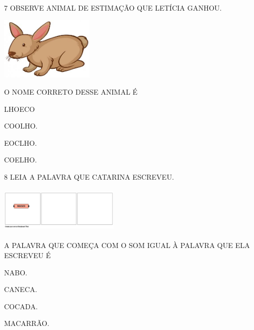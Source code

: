 
\num{7} OBSERVE ANIMAL DE ESTIMAÇÃO QUE LETÍCIA GANHOU.

\includegraphics[width=1.75903in,height=1.18611in]{media/image246.jpg}

O NOME CORRETO DESSE ANIMAL É

\begin{escolha}
\item LHOECO

\item COOLHO.

\item EOCLHO.

\item COELHO.
\end{escolha}


\num{8} LEIA A PALAVRA QUE CATARINA ESCREVEU.

\includegraphics[width=2.25361in,height=0.86599in]{media/image247.png}

A PALAVRA QUE COMEÇA COM O SOM IGUAL À PALAVRA QUE ELA ESCREVEU É 

\begin{escolha}
\item NABO.

\item CANECA.

\item COCADA.

\item MACARRÃO.
\end{escolha}

